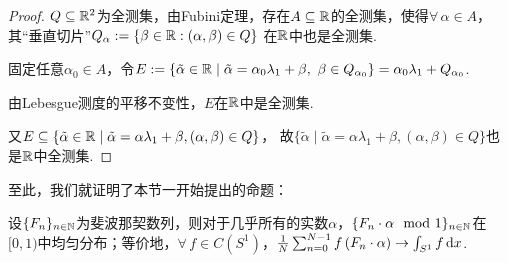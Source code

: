 \begin{proof}
$Q\subseteq \mathbb{R}^2$为全测集，由Fubini定理，存在$A\subseteq\mathbb{R}$的全测集，使得$\forall\,\alpha\in A$，其“垂直切片”$Q_\alpha:=\{\beta\in\mathbb{R}:(\alpha,\beta)\in Q\}$
在$\mathbb{R}$中也是全测集.\par
固定任意$\alpha_0\in A$，令$E:=\{\tilde{\alpha}\in\mathbb{R}\mid \tilde{\alpha}=\alpha_0\lambda_1+\beta,\ \beta\in Q_{\alpha_0}\}=\alpha_0\lambda_1+Q_{\alpha_0}$. \par
由Lebesgue测度的平移不变性，$E$在$\mathbb{R}$中是全测集.\par
又$E\subseteq\{\tilde{\alpha}\in\mathbb{R}\mid \tilde{\alpha}=\alpha\lambda_1+\beta,(\alpha,\beta)\in Q\}$，
故$\{\tilde{\alpha}\mid \tilde{\alpha}=\alpha\lambda_1+\beta,(\alpha,\beta)\in Q\}$也是$\mathbb{R}$中全测集.\par
\end{proof}
至此，我们就证明了本节一开始提出的命题：
\begin{proposition}
    设$\{F_n\}_{n\in\mathbb{N}}$为斐波那契数列，则对于几乎所有的实数$\alpha$，$\{F_n\cdot\alpha\mod 1\}_{n\in\mathbb{N}}$在$[0,1)$中均匀分布；等价地，$\forall\, f\in C(S^1)$，$\frac{1}{N}\sum_{n=0}^{N-1}{f\left(F_n\cdot\alpha\right)}\to\int_{S^1}{f}\mathop{}\!\mathrm{d} x$.
\end{proposition}

